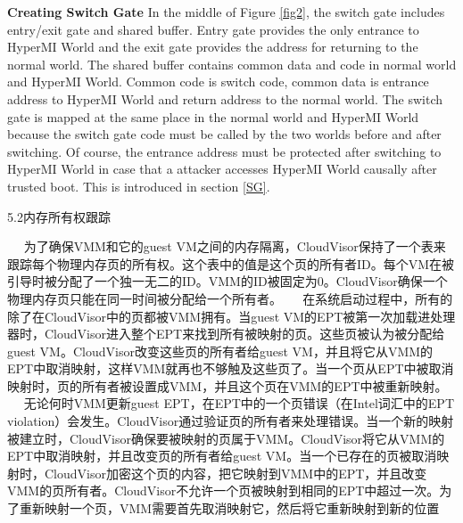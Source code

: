 \textbf{Creating Switch Gate}
In the middle of Figure \ref{fig2}, the switch gate includes entry/exit gate and shared buffer. Entry gate provides the only entrance to HyperMI World and the exit gate provides the address for returning to the normal world. The shared buffer contains common data and code in normal world and HyperMI World. Common code is switch code, common data is entrance address to HyperMI World and return address to the normal world. The switch gate is mapped at the same place in the normal world and HyperMI World because the switch gate code must be called by the two worlds before and after switching. Of course, the entrance address must be protected after switching to HyperMI World in case that a attacker accesses HyperMI World causally after trusted boot. This is introduced in section \ref{SG}.
\fi





\iffalse
5.2内存所有权跟踪

   为了确保VMM和它的guest VM之间的内存隔离，CloudVisor保持了一个表来跟踪每个物理内存页的所有权。这个表中的值是这个页的所有者ID。每个VM在被引导时被分配了一个独一无二的ID。VMM的ID被固定为0。CloudVisor确保一个物理内存页只能在同一时间被分配给一个所有者。
   在系统启动过程中，所有的除了在CloudVisor中的页都被VMM拥有。当guest VM的EPT被第一次加载进处理器时，CloudVisor进入整个EPT来找到所有被映射的页。这些页被认为被分配给guest VM。CloudVisor改变这些页的所有者给guest VM，并且将它从VMM的EPT中取消映射，这样VMM就再也不够触及这些页了。当一个页从EPT中被取消映射时，页的所有者被设置成VMM，并且这个页在VMM的EPT中被重新映射。
   无论何时VMM更新guest EPT，在EPT中的一个页错误（在Intel词汇中的EPT violation）会发生。CloudVisor通过验证页的所有者来处理错误。当一个新的映射被建立时，CloudVisor确保要被映射的页属于VMM。CloudVisor将它从VMM的EPT中取消映射，并且改变页的所有者给guest VM。当一个已存在的页被取消映射时，CloudVisor加密这个页的内容，把它映射到VMM中的EPT，并且改变VMM的页所有者。CloudVisor不允许一个页被映射到相同的EPT中超过一次。为了重新映射一个页，VMM需要首先取消映射它，然后将它重新映射到新的位置

